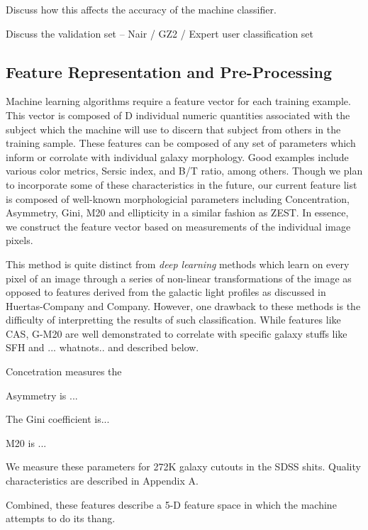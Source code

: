 \documentclass[twocolumn]{aastex6}
\begin{document}
Discuss how this affects the accuracy of the machine classifier. 

Discuss the validation set -- Nair / GZ2 / Expert user classification set


 
\subsection{Feature Representation and Pre-Processing}
Machine learning algorithms require a feature vector for each training example. This vector is composed of D individual numeric quantities associated with the subject which the machine will use to discern that subject from others in the training sample. These features can be composed of any set of parameters which inform or corrolate with individual galaxy morphology. Good examples include various color metrics, Sersic index, and B/T ratio, among others. Though we plan to incorporate some of these characteristics in the future, our current feature list is composed of well-known morphologicial parameters including Concentration, Asymmetry, Gini, M20 and ellipticity in a similar fashion as ZEST. In essence, we construct the feature vector based on measurements of the individual image pixels. 

This method is quite distinct from \textit{deep learning} methods which learn on every pixel of an image through a series of non-linear transformations of the image as opposed to features derived from the galactic light profiles as discussed in Huertas-Company and Company. However, one drawback to these methods is the difficulty of interpretting the results of such classification. While features like CAS, G-M20 are well demonstrated to correlate with specific galaxy stuffs like SFH and ... whatnots.. and described below. 

Concetration measures the 

Asymmetry is ... 

The Gini coefficient is... 

M20 is ... 

We measure these parameters for 272K galaxy cutouts  in the SDSS shits. Quality characteristics are described in Appendix A.  

Combined, these features describe a 5-D feature space in which the machine attempts to do its thang. 
\end{document}
